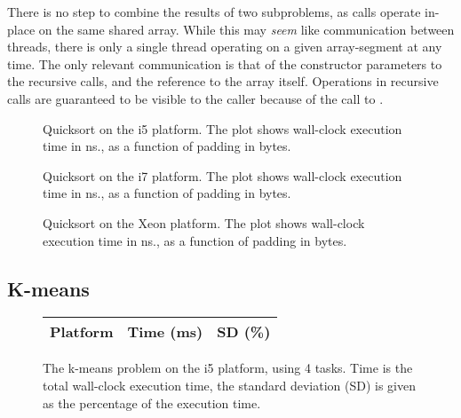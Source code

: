 There is no step to combine the results of two subproblems, as calls operate
in-place on the same shared array. While this may \textit{seem} like communication
between threads, there is only a single thread operating on a given
array-segment at any time. The only relevant communication is that of the
constructor parameters to the recursive calls, and the reference to the array
itself. Operations in
recursive calls are guaranteed to be visible to the caller because of the
call to .

\begin{figure}[hbpt]
\graphicspath{{plots/}}

	\caption{Quicksort on the i5 platform. The plot shows wall-clock execution time in
	ns., as a function of padding in bytes.}
	\label{fig:qsort-i5}
\end{figure}

\begin{figure}[hbpt]
\graphicspath{{plots/}}

	\caption{Quicksort on the i7 platform. The plot shows wall-clock execution time in
	ns., as a function of padding in bytes.}
	\label{fig:qsort-i7}
\end{figure}

\begin{figure}[hbpt]
\graphicspath{{plots/}}

	\caption{Quicksort on the Xeon platform. The plot shows wall-clock execution time in
	ns., as a function of padding in bytes.}
	\label{fig:qsort-xeon}
\end{figure}



\subsection{K-means}

\begin{figure}[hbtp]
	\centering
	\begin{tabular}{l r r}
		\hline
		\hline
		Platform & Time (ms) & SD (\%) \\
		\hline
		
		\hline
		\hline
	\end{tabular}
	\caption{The k-means problem on the i5 platform, using 4 tasks. Time is
	the total wall-clock execution time, the standard deviation (SD) is
	given as the percentage of the execution time.}
	\label{table:kmeans-i5}
\end{figure}

